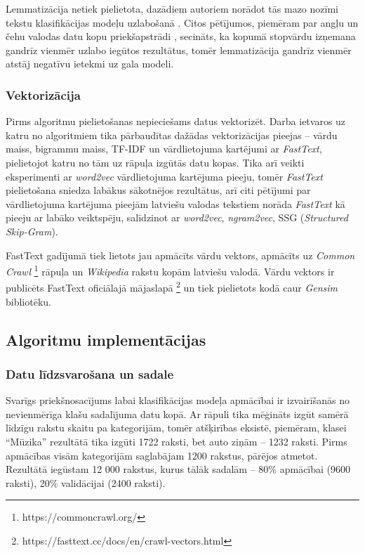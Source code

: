 Lemmatizācija netiek pielietota, dazādiem autoriem norādot tās mazo nozīmi tekstu klasifikācijas modeļu uzlabošanā \cite{santos2023effect}. Citos pētījumos, piemēram par angļu un čehu valodas datu kopu priekšapstrādi \cite{normalizationTextClassification}, secināts, ka kopumā stopvārdu izņemana gandrīz vienmēr uzlabo iegūtos rezultātus, tomēr lemmatizācija gandrīz vienmēr atstāj negatīvu ietekmi uz gala modeli.

\subsubsection{Vektorizācija}
Pirms algoritmu pielietošanas nepieciešams datus vektorizēt. Darba ietvaros uz katru no algoritmiem tika pārbaudītas dažādas vektorizācijas pieejas – vārdu maiss, bigrammu maiss, TF-IDF un vārdlietojuma kartējumi ar \textit{FastText}, pielietojot katru no tām uz rāpuļa izgūtās datu kopas. Tika arī veikti eksperimenti ar \textit{word2vec} vārdlietojuma kartējuma pieeju, tomēr \textit{FastText} pielietošana sniedza labākus sākotnējos rezultātus, arī citi pētījumi par vārdlietojuma kartējuma pieejām latviešu valodas tekstiem \cite{LaucisJekabsonWordEmbedding} norāda \textit{FastText} kā pieeju ar labāko veiktspēju, salīdzinot ar \textit{word2vec}, \textit{ngram2vec}, SSG (\textit{Structured Skip-Gram}).

FastText gadījumā tiek lietots jau apmācīts vārdu vektors, apmācīts uz \textit{Common Crawl} \footnote{https://commoncrawl.org/} rāpuļa un \textit{Wikipedia} rakstu kopām latviešu valodā. Vārdu vcktors ir publicēts FastText oficiālajā mājaslapā \footnote{https://fasttext.cc/docs/en/crawl-vectors.html} un tiek pielietots kodā caur \textit{Gensim} bibliotēku.

\subsection{Algoritmu implementācijas}

\subsubsection{Datu līdzsvarošana un sadale}
Svarīgs priekšnosacījums labai klasifikācijas modeļa apmācībai ir izvairīšanās no nevienmērīga klašu sadalījuma datu kopā. Ar rāpuli tika mēģināts izgūt samērā līdzīgu rakstu skaitu pa kategorijām, tomēr atšķirības eksistē, piemēram, klasei “Mūzika” rezultātā tika izgūti 1722 raksti, bet auto ziņām – 1232 raksti. Pirms apmācības visām kategorijām saglabājam 1200 rakstus, pārējos atmetot. Rezultātā iegūstam 12 000 rakstus, kurus tālāk sadalām – 80\% apmācībai (9600 raksti), 20\% validācijai (2400 raksti).

